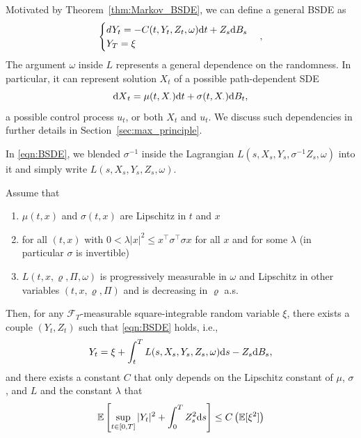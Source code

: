 \documentclass[11pt]{book}
\newcommand{\dd}{\text{\normalfont d}}
\newcommand{\dt}{\text{\normalfont d}t}
\newcommand{\ds}{\text{\normalfont d}s}
\newcommand{\dX}{\text{\normalfont d}X}
\begin{document}
Motivated by Theorem~\ref{thm:Markov_BSDE}, we can define a general BSDE as 
\begin{equation}\label{eqn:BSDE}
	\begin{cases}
		dY_t=-C(t,Y_t,Z_t,\omega){{\dt}}+Z_s{\dd}B_s\\
		Y_T=\xi
	\end{cases},
\end{equation}
The argument $\omega$ inside $L$ represents a general dependence on the randomness. In particular, it can represent solution $X_t$ of a possible path-dependent SDE
\begin{equation}
	{\dX}_t=\mu(t,X_\cdot){{\dt}}+\sigma(t,X_\cdot){\dd}B_t,
\end{equation}   
a possible control process $u_t$, or both $X_t$ and $u_t$. We discuss such dependencies in further details in Section~\ref{sec:max_principle}.
\begin{rem}
	In \eqref{eqn:BSDE}, we blended $\sigma^{-1}$ inside the Lagrangian $L(s,X_s,Y_s,\sigma^{-1}Z_s,\omega)$  into it and simply write $L(s,X_s,Y_s,Z_s,\omega)$.
\end{rem}
\begin{thm}
Assume that 
\begin{enumerate}[label=\bfseries \roman*)]
\item $\mu(t,x)$ and $\sigma(t,x)$ are Lipschitz in $t$ and $x$
\item for all $(t,x)$ with $0<\lambda|x|^2\le x^{\top}\sigma^{\top}\sigma x$ for all $x$ and  for some $\lambda$ (in particular $\sigma$ is invertible)
\item $L(t,x,\varrho,\Pi,\omega)$ is progressively measurable in $\omega$ and Lipschitz in  other variables $(t,x,\varrho,\Pi)$ and is decreasing in $\varrho$ a.s.
\end{enumerate} 
Then, for any $\mathcal{F}_T$-measurable square-integrable random variable $\xi$, there exists a couple $(Y_t,Z_t)$ such that \eqref{eqn:BSDE} holds, i.e.,
\begin{equation}
Y_t=\xi+\int_t^TL(s,X_s,Y_s,Z_s,\omega){{\ds}}-Z_s{\dd}B_s,
\end{equation}
and there exists a constant $C$ that only depends on the Lipschitz constant of $\mu$, $\sigma$, and  $L$ and the constant $\lambda$ that
\begin{equation}
\mathbb{E}\left[\sup_{t\in[0,T]}|Y_t|^2+\int_0^TZ_s^2{{\ds}}\right]\le C\left(\mathbb{E}[\xi^2]\right)
\end{equation}
\end{thm}
\end{document}

